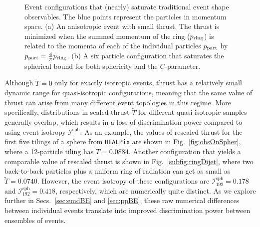 \documentclass[letterpaper,11pt]{article}
\DeclareRobustCommand{\Secs}[2]{Secs.~\ref{#1} and \ref{#2}}
\DeclareRobustCommand{\Fig}[1]{Fig.~\ref{#1}}
\begin{document}
\begin{figure}[t!]
\centering
$\qquad$
\caption{Event configurations that (nearly) saturate traditional event shape observables.
%
The blue points represent the particles in momentum space.
%
(a) An anisotropic event with small thrust.  The thrust is minimized when the summed momentum of the ring ($p_{\rm ring}$) is related to the momenta of each of the individual particles $p_{\rm part}$ by $p_{\rm part} = \frac{4}{\pi} p_{\rm ring}$.
%
(b) A six particle configuration that saturates the spherical bound for both sphericity and the $C$-parameter.}
%
\label{fig:dijetThrust}
%
\end{figure}
Although $\widetilde{T} = 0$ only for exactly isotropic events, thrust has a relatively small dynamic range for quasi-isotropic configurations, meaning that the same value of thrust can arise from many different event topologies in this regime.
%
More specifically, distributions in scaled thrust $\widetilde{T}$ for different quasi-isotropic samples generally overlap, which results in a loss of discrimination power compared to using event isotropy $\mathcal{I}^\text{sph}$.
%
As an example, the values of rescaled thrust for the first five tilings of a sphere from \texttt{HEALPix} are shown in \Fig{fig:obsOnSpher}, where a 12-particle tiling has $\widetilde{T}=0.0884$. 
%
Another configuration that yields a comparable value of rescaled thrust is shown in \Fig{subfig:ringDijet}, where two back-to-back particles plus a uniform ring of radiation can get as small as $\widetilde{T}=0.0740$.
%
However, the event isotropy of these configurations are $\mathcal{I}^\text{sph}_{192} = 0.178$ and $\mathcal{I}^\text{sph}_{192} = 0.418$, respectively, which are numerically quite distinct.
%
As we explore further in \Secs{sec:emdBE}{sec:ppBE}, these raw numerical differences between individual events translate into improved discrimination power between ensembles of events.
%
\end{document}
